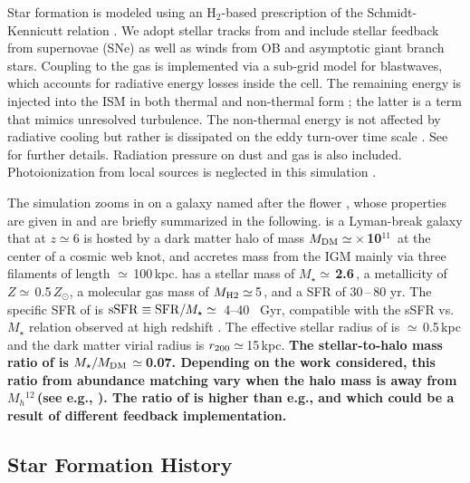 \IfFileExists{emulateapjlegacy.cls}{\documentclass[iop]{emulateapjlegacy}}{\documentclass[iop]{emulateapj}}
\begin{document}
Star formation is modeled using an H$_2$-based prescription of the Schmidt-Kennicutt relation \citep{Krumholz09a}. We adopt stellar tracks from  and include stellar feedback from supernovae (SNe) as well as winds from OB and asymptotic giant branch stars. Coupling to the gas is implemented via a sub-grid model for blastwaves, which accounts for radiative energy losses inside the cell.
%
The remaining energy is injected into the ISM in both thermal and non-thermal form \citep{Agertz13a}; the latter is a term that mimics unresolved turbulence. The non-thermal energy is not affected by radiative cooling but rather is dissipated on the eddy turn-over time scale \citep{Maclow99a}. See \citet{Pallottini17b} for further details.
%
Radiation pressure on dust and gas is also included. Photoionization from local sources is neglected in this simulation \citep[see][for its effect]{Pallottini19a, Decataldo19a}.

The simulation zooms in on a galaxy named after the flower \flower, whose properties are given in \citet{Pallottini17a} and are briefly summarized in the following. \flower is a Lyman-break galaxy that at $z\simeq 6$ is hosted by a dark matter halo of mass
{\bf $M_{\rm DM}\simeq$\,$\times$\,10$^{11}$\,\Msun} at the center of a cosmic web knot, and accretes mass from the IGM mainly via three filaments of length $\simeq$\,100\,kpc. \flower has a stellar mass of {\bf $M_\star\simeq$\,2.6\,\Msun}, a metallicity of $Z\simeq$\,0.5\,$Z_{\odot}$, a molecular gas mass of $M_{\rm H2}\simeq$\,5\,\Msun, and a SFR of 30\,--\,80\,\Msun\,yr\pmOne.
%
The specific SFR of \flower is ${\rm sSFR} \equiv {\rm SFR}/M_{\star} \simeq$~4--40 ~Gyr\pmOne, compatible with the sSFR vs.\ $M_{\star}$ relation observed at high redshift \citep{Jiang16a}. The effective stellar radius of \flower is $\simeq$\,0.5\,kpc and the dark matter virial radius is $r_{\rm 200}\simeq$\,15\,kpc.
{\bf The stellar-to-halo mass ratio of \flower is $M_\star/M_{\rm DM}\,\simeq\,$0.07.
Depending on the work considered, this ratio from abundance matching vary when the halo mass is away from $M_h$$^{12}$\,\Msun (see e.g., \citealt{Moster13a, Behroozi13b, Behroozi15a, Moster18a}). The ratio of \flower is higher than e.g., \citet{Katz17a}  and \citet{Ceverino17a} which could be a result of different feedback implementation.
}


\subsection{Star Formation History} \label{sec:sfh}
\end{document}
